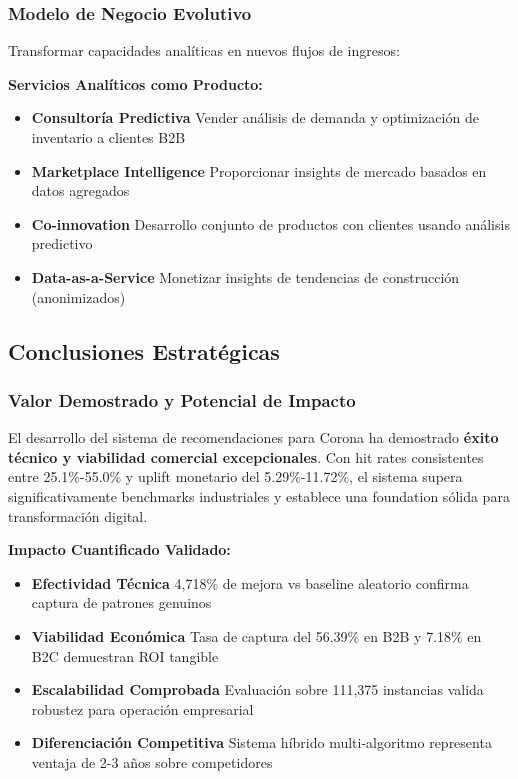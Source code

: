 \documentclass[twocolumn]{article}
\begin{document}
\subsubsection{Modelo de Negocio Evolutivo}

Transformar capacidades analíticas en nuevos flujos de ingresos:

\textbf{Servicios Analíticos como Producto:}
\begin{itemize}
    \item \textbf{Consultoría Predictiva} Vender análisis de demanda y optimización de inventario a clientes B2B
    \item \textbf{Marketplace Intelligence} Proporcionar insights de mercado basados en datos agregados
    \item \textbf{Co-innovation} Desarrollo conjunto de productos con clientes usando análisis predictivo
    \item \textbf{Data-as-a-Service} Monetizar insights de tendencias de construcción (anonimizados)
\end{itemize}

\subsection{Conclusiones Estratégicas}

\subsubsection{Valor Demostrado y Potencial de Impacto}

El desarrollo del sistema de recomendaciones para Corona ha demostrado \textbf{éxito técnico y viabilidad comercial excepcionales}. Con hit rates consistentes entre 25.1\%-55.0\% y uplift monetario del 5.29\%-11.72\%, el sistema supera significativamente benchmarks industriales y establece una foundation sólida para transformación digital.

\textbf{Impacto Cuantificado Validado:}
\begin{itemize}
    \item \textbf{Efectividad Técnica} 4,718\% de mejora vs baseline aleatorio confirma captura de patrones genuinos
    \item \textbf{Viabilidad Económica} Tasa de captura del 56.39\% en B2B y 7.18\% en B2C demuestran ROI tangible
    \item \textbf{Escalabilidad Comprobada} Evaluación sobre 111,375 instancias valida robustez para operación empresarial
    \item \textbf{Diferenciación Competitiva} Sistema híbrido multi-algoritmo representa ventaja de 2-3 años sobre competidores
\end{itemize}
\end{document}
